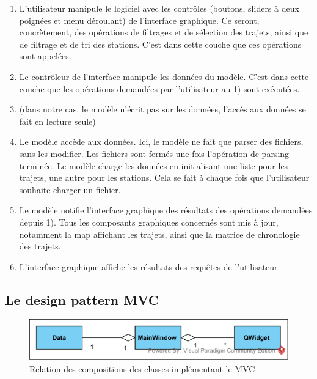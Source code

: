 \documentclass[12pt]{article}
\begin{document}
		\begin{enumerate}
		\item L'utilisateur manipule le logiciel avec les contrôles (boutons, sliders à deux
		poignées et menu déroulant) de l’interface graphique. Ce seront, concrètement,
		des opérations de filtrages et de sélection des trajets, ainsi que de filtrage
		et de tri des stations. C’est dans cette couche que ces opérations sont appelées.\\
		
		\item Le contrôleur de l’interface manipule les données du modèle. C’est dans cette
		couche que les opérations demandées par l’utilisateur au 1) sont exécutées.\\
		
		\item (dans notre cas, le modèle n’écrit pas sur les données, l’accès aux données se
		fait en lecture seule)\\
		
		\item Le modèle accède aux données. Ici, le modèle ne fait que parser des fichiers,
		sans les modifier. Les fichiers sont fermés une fois l’opération de parsing
		terminée. Le modèle charge les données en initialisant une liste pour les trajets,
		une autre pour les stations. Cela se fait à chaque fois que l’utilisateur
		souhaite charger un fichier.\\
		
		\item Le modèle notifie l’interface graphique des résultats des opérations demandées
		depuis 1). Tous les composants graphiques concernés sont mis à jour, notamment la
		map affichant les trajets, ainsi que la matrice de chronologie des trajets.\\
		
		\item L’interface graphique affiche les résultats des requêtes de l'utilisateur.\\
		\end{enumerate}

		\subsection{Le design pattern MVC}		
		\begin{figure}[!h]
		\begin{center}
		\includegraphics[scale=1]{dia_class_mvc.png}
		\caption{Relation des compositions des classes implémentant le MVC}
		\end{center}
		\end{figure}		
		
\end{document}
